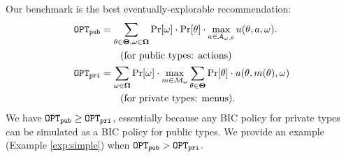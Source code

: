 Our benchmark is the best eventually-explorable recommendation:
\begin{align*}
\mathtt{OPT}_{\mathtt{pub}} &= \sum_{\theta \in \bold{\Theta}, \omega\in \bold{\Omega}} \Pr[\omega] \cdot \Pr[\theta] \cdot \max_{a \in \mathcal{A}_{\omega,\theta}} u(\theta, a, \omega).\\
    &\qquad\text{(for public types: actions)}\\
\mathtt{OPT}_{\mathtt{pri}} &= \sum_{\omega\in \bold{\Omega}} \Pr[\omega] \cdot\max_{m \in \mathcal{M}_{\omega}}\sum_{\theta \in \bold{\Theta}} \Pr[\theta] \cdot  u(\theta, m(\theta), \omega)\\
&\qquad\text{(for private types: menus)}.
\end{align*}
We have $\mathtt{OPT}_{\mathtt{pub}} \geq \mathtt{OPT}_{\mathtt{pri}}$, essentially because any BIC policy for private types can be simulated as a BIC policy for public types. We provide an example (Example \ref{exp:simple}) when $\mathtt{OPT}_{\mathtt{pub}} > \mathtt{OPT}_{\mathtt{pri}}$.

